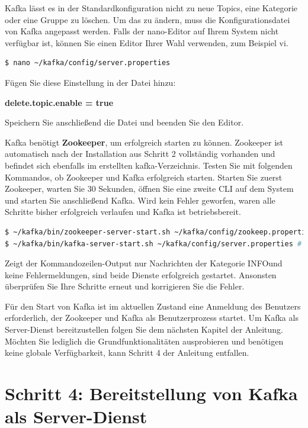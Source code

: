 \documentclass[a4paper,titlepage,halfparskip,12pt]{scrreprt}
\begin{document}
Kafka lässt es in der Standardkonfiguration nicht zu neue Topics, eine Kategorie oder eine Gruppe zu löschen. Um das zu ändern, muss die Konfigurationsdatei von Kafka angepasst werden. Falls der \glqq nano\grqq -Editor auf Ihrem System nicht verfügbar ist, können Sie einen Editor Ihrer Wahl verwenden, zum Beispiel \glqq vi\grqq.

\smallskip

\begin{lstlisting}[language=Bash]
$ nano ~/kafka/config/server.properties
\end{lstlisting}

Fügen Sie diese Einstellung in der Datei hinzu:

\textbf{delete.topic.enable = true}

Speichern Sie anschließend die Datei und beenden Sie den Editor.

Kafka benötigt \textbf{Zookeeper}, um erfolgreich starten zu können. Zookeeper ist automatisch nach der Installation aus Schritt 2 vollständig vorhanden und befindet sich ebenfalls im erstellten \glqq kafka\grqq -Verzeichnis. Testen Sie mit folgenden Kommandos, ob Zookeeper und Kafka erfolgreich starten. Starten Sie zuerst Zookeeper, warten Sie 30 Sekunden, öffnen Sie eine zweite CLI auf dem System und starten Sie anschließend Kafka. Wird kein Fehler geworfen, waren alle Schritte bisher erfolgreich verlaufen und Kafka ist betriebsbereit.

\smallskip

\begin{lstlisting}[language=Bash]
$ ~/kafka/bin/zookeeper-server-start.sh ~/kafka/config/zookeep.properties # Start: zookeeper
$ ~/kafka/bin/kafka-server-start.sh ~/kafka/config/server.properties # Start: kafka
\end{lstlisting}

Zeigt der Kommandozeilen-Output nur Nachrichten der Kategorie \glqq INFO\grqq und keine Fehlermeldungen, sind beide Dienste erfolgreich gestartet. Ansonsten überprüfen Sie Ihre Schritte erneut und korrigieren Sie die Fehler.

Für den Start von Kafka ist im aktuellen Zustand eine Anmeldung des Benutzers erforderlich, der Zookeeper und Kafka als Benutzerprozess startet. Um Kafka als Server-Dienst bereitzustellen folgen Sie dem nächsten Kapitel der Anleitung. Möchten Sie lediglich die Grundfunktionalitäten ausprobieren und benötigen keine globale Verfügbarkeit, kann Schritt 4 der Anleitung entfallen.

\section{Schritt 4: Bereitstellung von Kafka als Server-Dienst}
\end{document}
